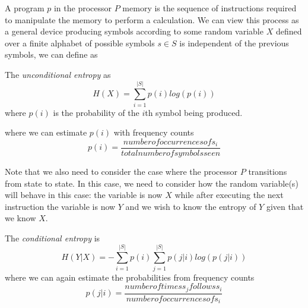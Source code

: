 \documentclass[times, 10pt,onecolumn]{article}
\begin{document}
A program $p$ in the processor $P$ memory is the sequence of instructions
required to manipulate the memory to perform a calculation.   We can view this process as a general device producing symbols
according to some random variable $X$ defined over a finite alphabet of
possible symbols $s\in S$ is independent of the previous symbols, we can
define as
\begin{defn}
  The \textit{unconditional entropy} as
  \begin{equation}
    \label{eq:uncodent}
    H(X)=\sum_{i=1}^{|S|}p(i)log(p(i))
  \end{equation}
  where $p(i)$ is the probability of the $i$th symbol being produced.
\end{defn}
where we can estimate $p(i)$ with frequency counts
\begin{equation}
  \label{eq:freqcntsym}
  p(i)=\frac{number of occurrences of s_{i}}{total number of symbols seen}
\end{equation}

Note that we also need to consider the case where the processor $P$
transitions from state to state.  In this case, we need to consider how the
random variable(s) will behave in this case:  the variable is now $X$ while
after executing the next instruction the variable is now $Y$ and we wish to
know the entropy of $Y$ given that we know $X$.
\begin{defn}
  The \textit{conditional entropy} is
  \begin{equation}
    \label{eq:condent}
    H(Y|X)=-\sum_{i=1}^{|S|}p(i)\sum_{j=1}^{|S|}p(j|i)log(p(j|i))
  \end{equation}
  where we can again estimate the probabilities from frequency counts
  \begin{equation}
    \label{eq:freqcnt}
    p(j|i)=\frac{number of times s_{j} follows s_{i}}{number of occurrences of
    s_{i}}
  \end{equation}
\end{defn}
\end{document}

